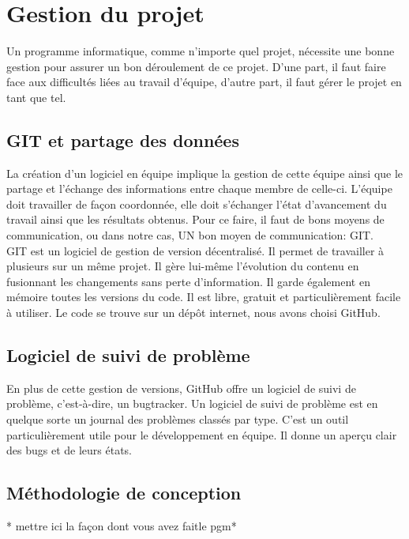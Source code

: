\section{Gestion du projet}
Un programme informatique, comme n'importe quel projet, nécessite une bonne gestion pour assurer un bon déroulement de ce projet.
D'une part, il faut faire face aux difficultés liées au travail d'équipe, d'autre part, il faut gérer le projet en tant que tel.

  \subsection{GIT et partage des données}
  La création d'un logiciel en équipe implique la gestion de cette équipe ainsi que le partage et l'échange des
  informations entre chaque membre de celle-ci.
  L'équipe doit travailler de façon coordonnée, elle doit s'échanger l'état
  d'avancement du travail ainsi que les résultats obtenus. Pour ce faire, il faut
  de bons moyens de communication, ou dans notre cas, UN bon moyen de communication: GIT\cite{git}. \\

  GIT est un logiciel de gestion de version décentralisé. Il permet de
  travailler à plusieurs sur un même projet. Il gère lui-même l'évolution du
  contenu en fusionnant les changements sans perte d'information. Il garde
  également en mémoire toutes les versions du code. Il est libre, gratuit et
  particulièrement facile à utiliser. Le code se trouve sur un dépôt internet, nous avons choisi GitHub\cite{github}.\\

  \subsection{Logiciel de suivi de problème}
  En plus de cette gestion de versions, GitHub offre un logiciel de suivi de problème, c'est-à-dire, un bugtracker.
  Un logiciel de suivi de problème est en quelque sorte un journal des problèmes classés par type.
  C'est un outil particulièrement utile pour le développement en équipe. Il donne un aperçu clair des bugs et de leurs états.

  \subsection{Méthodologie de conception}
    * mettre ici la façon dont vous avez \og fait\fg le pgm* \\
    
